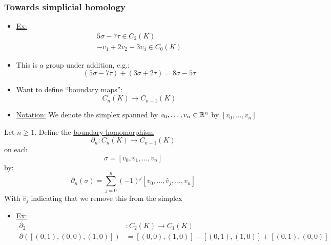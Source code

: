 \documentclass[../notes.tex]{subfiles}
\begin{document}
\subsubsection{Towards simplicial homology}
\begin{itemize}
    \item \underline{Ex:}
        \begin{align*}
            5\sigma-7\tau\in C_2(K)\\
            -v_1+2v_2-3v_4\in C_0(K)
        \end{align*}
    \item This is a group under addition, e.g.:
        \[
            (5\sigma-7\tau)+(3\sigma+2\tau)=8\sigma-5\tau
        \]
    \item Want to define ``boundary maps'':
        \[
            C_n(K)\rightarrow C_{n-1}(K)
        \]
    \item \underline{Notation:} We denote the simplex spanned by $v_0,\dots,v_n\in\mathbb{R}^n$
        by $[v_0,\dots,v_n]$
\end{itemize}
\begin{definition}
    Let $n$. Define the \underline{boundary homomorphism}
    \[
        \partial_n:C_n(K)\rightarrow C_{n-1}(K)
    \]
    on each
    \[
        \sigma = [v_0,v_1,\dots,v_n]
    \]
    by:
    \[
        \partial_n(\sigma)=\sum_{j=0}^{n}(-1)^j[v_0,\dots,\hat{v}_j,\dots,v_n]
    \]
    With $_j$ indicating that we remove this from the simplex
\end{definition}
\newpage
\begin{itemize}
    \item \underline{Ex:}
        \begin{align*}
            \partial_2&:C_2(K)\rightarrow C_1(K)\\
            \partial([(0,1),(0,0),(1,0)])&=[(0,0),(1,0)]-[(0,1),(1,0)]+[(0,1),(0,0)]
        \end{align*}
\end{itemize}
\end{document}
